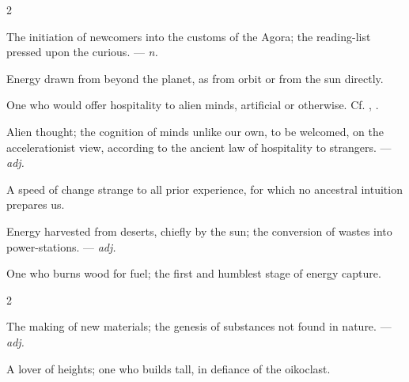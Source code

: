 \begin{multicols}{2}

 The initiation of newcomers into the customs of the Agora; the reading-list pressed upon the curious. —  \textit{n.}

 Energy drawn from beyond the planet, as from orbit or from the sun directly.

 One who would offer hospitality to alien minds, artificial or otherwise. Cf. , .

 Alien thought; the cognition of minds unlike our own, to be welcomed, on the accelerationist view, according to the ancient law of hospitality to strangers. —  \textit{adj.}

 A speed of change strange to all prior experience, for which no ancestral intuition prepares us. 

 Energy harvested from deserts, chiefly by the sun; the conversion of wastes into power-stations. —  \textit{adj.}

  One who burns wood for fuel; the first and humblest stage of energy capture.

\end{multicols}

\begin{multicols}{2}

 The making of new materials; the genesis of substances not found in nature. —  \textit{adj.}

 A lover of heights; one who builds tall, in defiance of the oikoclast.

\end{multicols}


